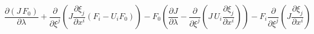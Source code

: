 \[\frac{{\partial \left( {J\,{F_0}} \right)}}{{\partial \lambda }} + \frac{\partial }{{\partial {\xi ^j}}}\left( {J\frac{{\partial {\xi _j}}}{{\partial {x^i}}}\left( {{F_i} - {U_i}{F_0}} \right)} \right) - {F_0}\left( {\frac{{\partial J}}{{\partial \lambda }} - \frac{\partial }{{\partial {\xi ^j}}}\left( {J\,{U_i}\frac{{\partial {\xi _j}}}{{\partial {x^i}}}} \right)} \right) - {F_i}\frac{\partial }{{\partial {\xi ^j}}}\left( {J\frac{{\partial {\xi _j}}}{{\partial {x^i}}}} \right)\]

